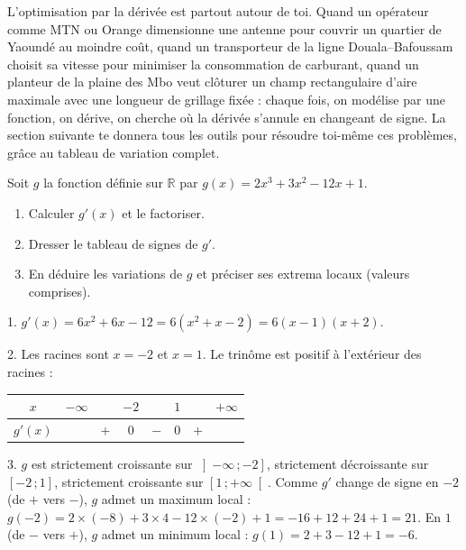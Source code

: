 \documentclass[11pt]{article}
\begin{document}
\begin{savaistu}
L'optimisation par la dérivée est partout autour de toi. Quand un opérateur comme MTN ou Orange dimensionne une antenne pour couvrir un quartier de Yaoundé au moindre coût, quand un transporteur de la ligne Douala--Bafoussam choisit sa vitesse pour minimiser la consommation de carburant, quand un planteur de la plaine des Mbo veut clôturer un champ rectangulaire d'aire maximale avec une longueur de grillage fixée : chaque fois, on modélise par une fonction, on dérive, on cherche où la dérivée s'annule en changeant de signe. La section suivante te donnera tous les outils pour résoudre toi-même ces problèmes, grâce au tableau de variation complet.
\end{savaistu}

\begin{exercice}
Soit $g$ la fonction définie sur $\mathbb{R}$ par $g(x) = 2x^3 + 3x^2 - 12x + 1$.
\begin{enumerate}
\item Calculer $g'(x)$ et le factoriser.
\item Dresser le tableau de signes de $g'$.
\item En déduire les variations de $g$ et préciser ses extrema locaux (valeurs comprises).
\end{enumerate}
\end{exercice}

\begin{corrige}
1. $g'(x) = 6x^2 + 6x - 12 = 6(x^2 + x - 2) = 6(x-1)(x+2)$.

2. Les racines sont $x = -2$ et $x = 1$. Le trinôme est positif à l'extérieur des racines :

\begin{center}
\begin{tabular}{|c|ccccccc|}
\hline
$x$ & $-\infty$ & & $-2$ & & $1$ & & $+\infty$ \\
\hline
$g'(x)$ & & $+$ & $0$ & $-$ & $0$ & $+$ & \\
\hline
\end{tabular}
\end{center}

3. $g$ est strictement croissante sur $\left]-\infty\,; -2\right]$, strictement décroissante sur $\left[-2\,; 1\right]$, strictement croissante sur $\left[1\,; +\infty\right[$. Comme $g'$ change de signe en $-2$ (de $+$ vers $-$), $g$ admet un maximum local : $g(-2) = 2\times(-8) + 3\times 4 - 12\times(-2) + 1 = -16 + 12 + 24 + 1 = 21$. En $1$ (de $-$ vers $+$), $g$ admet un minimum local : $g(1) = 2 + 3 - 12 + 1 = -6$.
\end{corrige}
\end{document}
